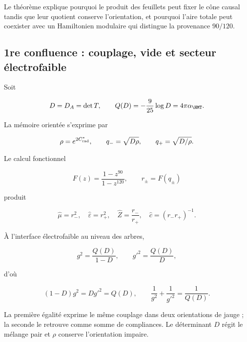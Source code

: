 Le théorème explique pourquoi le produit des feuillets peut fixer le cône causal tandis que leur quotient conserve l’orientation, et pourquoi l’aire totale peut coexister avec un Hamiltonien modulaire qui distingue la provenance \(90/120\).

\subsection{1re confluence : couplage, vide et secteur électrofaible}

Soit

\begin{equation}
 D=D_A=\det T,
 \qquad
 Q(D)=-\frac9{25}\log D=4\pi\alpha_{\HMT}.
 \label{rm:eq:confluence-q-d}
\end{equation}

La mémoire orientée s’exprime par

\begin{equation}
 \rho=e^{2C^*_{\rm rad}},
 \qquad
 q_-=\sqrt{D\rho},
 \qquad
 q_+=\sqrt{D/\rho}.
 \label{rm:eq:confluence-qpm}
\end{equation}

Le calcul fonctionnel

\begin{equation}
 F(z)=\frac{1-z^{90}}{1-z^{120}},
 \qquad
 r_\pm=F(q_\pm)
 \label{rm:eq:confluence-F}
\end{equation}

produit

\begin{equation}
 \widehat\mu=r_-^2,
 \quad
 \widehat\varepsilon=r_+^2,
 \quad
 \widehat Z=\frac{r_-}{r_+},
 \quad
 \widehat c=(r_-r_+)^{-1}.
 \label{rm:eq:confluence-vacuum}
\end{equation}

À l’interface électrofaible au niveau des arbres,

\begin{equation}
 g^2=\frac{Q(D)}{1-D},
 \qquad
 g'^2=\frac{Q(D)}{D},
 \label{rm:eq:confluence-gauge-couplings}
\end{equation}

d'où

\begin{equation}
 \boxed{
 (1-D)g^2=Dg'^2=Q(D),
 \qquad
 \frac1{g^2}+\frac1{g'^2}=\frac1{Q(D)}.}
 \label{rm:eq:confluence-ew-master}
\end{equation}

La première égalité exprime le même couplage dans deux orientations de jauge ; la seconde le retrouve comme somme de compliances. Le déterminant \(D\) régit le mélange pair et \(\rho\) conserve l’orientation impaire.

